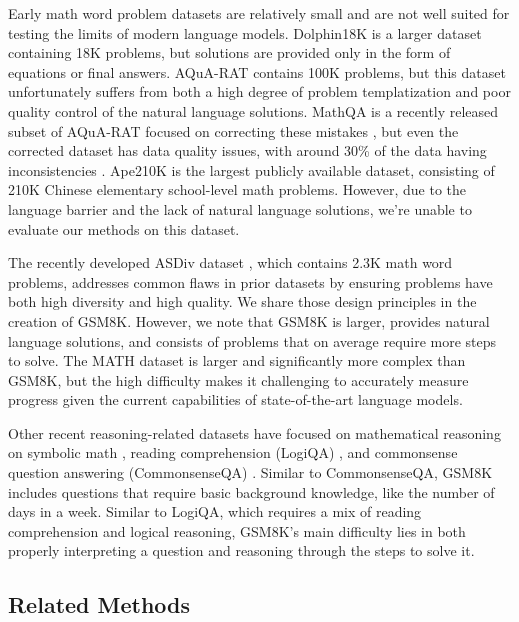 Early math word problem datasets \citep{kushman2014learning, roy-roth-2015-solving} are relatively small and are not well suited for testing the limits of modern language models. Dolphin18K \citep{huang2016well} is a larger dataset containing 18K problems, but solutions are provided only in the form of equations or final answers. AQuA-RAT \citep{ling2017program} contains 100K problems, but this dataset unfortunately suffers from both a high degree of problem templatization and poor quality control of the natural language solutions. MathQA is a recently released subset of AQuA-RAT focused on correcting these mistakes \citep{amini2019mathqa}, but even the corrected dataset has data quality issues, with around 30\% of the data having inconsistencies \citep{miao2021diverse}. Ape210K \citep{zhao2020ape210k} is the largest publicly available dataset, consisting of 210K Chinese elementary school-level math problems. However, due to the language barrier and the lack of natural language solutions, we're unable to evaluate our methods on this dataset.

The recently developed ASDiv dataset \citep{miao2021diverse}, which contains 2.3K math word problems, addresses common flaws in prior datasets by ensuring problems have both high diversity and high quality. We share those design principles in the creation of GSM8K. However, we note that GSM8K is larger, provides natural language solutions, and consists of problems that on average require more steps to solve. The MATH dataset \citep{hendrycks2021measuring} is larger and significantly more complex than GSM8K, but the high difficulty makes it challenging to accurately measure progress given the current capabilities of state-of-the-art language models.

Other recent reasoning-related datasets have focused on mathematical reasoning on symbolic math \citep{lample2019deep}, reading comprehension (LogiQA) \citep{Liu2020LogiQAAC}, and commonsense question answering (CommonsenseQA) \citep{talmor2018commonsenseqa}. Similar to CommonsenseQA, GSM8K includes questions that require basic background knowledge, like the number of days in a week. Similar to LogiQA, which requires a mix of reading comprehension and logical reasoning, GSM8K's main difficulty lies in both properly interpreting a question and reasoning through the steps to solve it.

\subsection{Related Methods}

